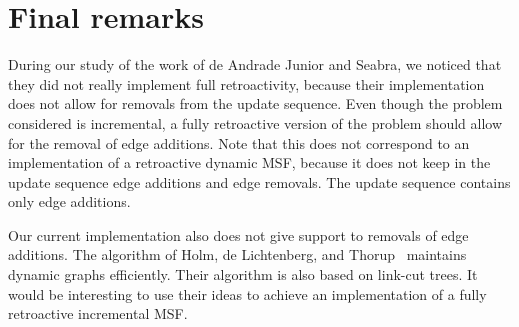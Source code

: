 \documentclass[3p,times,procedia]{elsarticle}
\begin{document}
\section{Final remarks}\label{sec:final}


During our study of the work of de Andrade Junior and Seabra, we noticed that
they did not really implement full retroactivity, because their implementation
does not allow for removals from the update sequence.  Even though the problem
considered is incremental, a fully retroactive version of the problem should
allow for the removal of edge additions.  Note that this does not correspond
to an implementation of a retroactive dynamic MSF, because it does not keep
in the update sequence edge additions and edge removals.  The update sequence
contains only edge additions.

Our current implementation also does not give support to removals of edge additions.
The algorithm of Holm, de Lichtenberg, and Thorup~\cite{HolmLT2001} maintains
dynamic graphs efficiently.  Their algorithm is also based on link-cut trees.
It would be interesting to use their ideas to achieve an implementation of
a fully retroactive incremental MSF.













\end{document}
